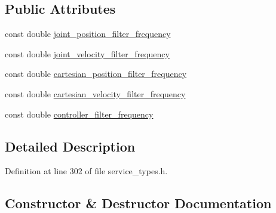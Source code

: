 \subsection*{Public Attributes}
\begin{DoxyCompactItemize}
\item 
const double \hyperlink{structresearch__interface_1_1robot_1_1SetFilters_1_1Request_a860f89da9defdcc600d13ecf9f48593f}{joint\+\_\+position\+\_\+filter\+\_\+frequency}
\item 
const double \hyperlink{structresearch__interface_1_1robot_1_1SetFilters_1_1Request_a5da8f47649157c38440941e8a55eb263}{joint\+\_\+velocity\+\_\+filter\+\_\+frequency}
\item 
const double \hyperlink{structresearch__interface_1_1robot_1_1SetFilters_1_1Request_a9b718eefa760ad1ef370c41a4573e504}{cartesian\+\_\+position\+\_\+filter\+\_\+frequency}
\item 
const double \hyperlink{structresearch__interface_1_1robot_1_1SetFilters_1_1Request_add0117259ca298a78e3f51784a5eed26}{cartesian\+\_\+velocity\+\_\+filter\+\_\+frequency}
\item 
const double \hyperlink{structresearch__interface_1_1robot_1_1SetFilters_1_1Request_a0722f3d1bcfbd280c440f1a0762d9541}{controller\+\_\+filter\+\_\+frequency}
\end{DoxyCompactItemize}


\subsection{Detailed Description}


Definition at line 302 of file service\+\_\+types.\+h.



\subsection{Constructor \& Destructor Documentation}
\mbox{\label{structresearch__interface_1_1robot_1_1SetFilters_1_1Request_af1168f285d6455b9a64395146ee9498f}} 

